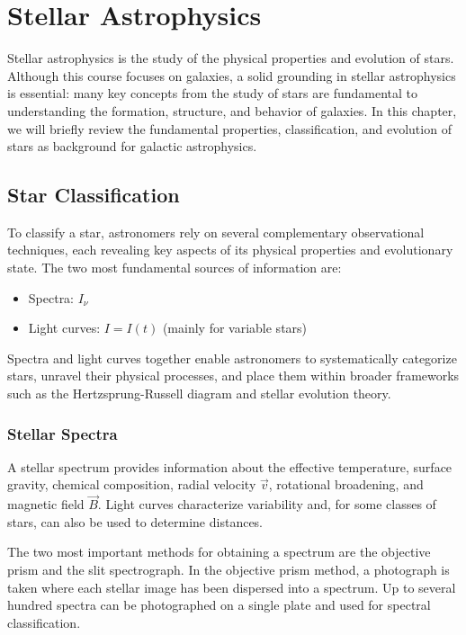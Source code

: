 \chapter{Stellar Astrophysics}

Stellar astrophysics is the study of the physical properties and evolution of stars. Although this course focuses on galaxies, a solid grounding in stellar astrophysics is essential: many key concepts from the study of stars are fundamental to understanding the formation, structure, and behavior of galaxies. In this chapter, we will briefly review the fundamental properties, classification, and evolution of stars as background for galactic astrophysics.

\section{Star Classification}

To classify a star, astronomers rely on several complementary observational techniques, each revealing key aspects of its physical properties and evolutionary state. The two most fundamental sources of information are:

\begin{itemize}
    \item Spectra: $I_\nu$
    \item Light curves: $I = I(t)$ (mainly for variable stars)
\end{itemize}

Spectra and light curves together enable astronomers to systematically categorize stars, unravel their physical processes, and place them within broader frameworks such as the Hertzsprung-Russell diagram and stellar evolution theory.

\subsection{Stellar Spectra}

A stellar spectrum provides information about the effective temperature, surface gravity, chemical composition, radial velocity $\vec{v}$, rotational broadening, and magnetic field $\vec{B}$. Light curves characterize variability and, for some classes of stars, can also be used to determine distances.

The two most important methods for obtaining a spectrum are the objective prism and the slit spectrograph. In the objective prism method, a photograph is taken where each stellar image has been dispersed into a spectrum. Up to several hundred spectra can be photographed on a single plate and used for spectral classification.

